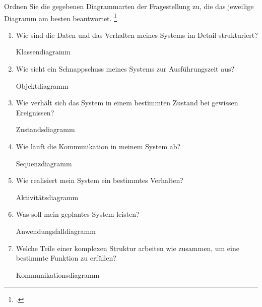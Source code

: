 \documentclass{bschlangaul-aufgabe}
\begin{document}

Ordnen Sie die gegebenen Diagrammarten der Fragestellung zu, die das
jeweilige Diagramm am besten beantwortet.
\footcite{sosy:e-klausur}

\begin{enumerate}

\item Wie sind die Daten und das Verhalten meines Systems im Detail
strukturiert?

\begin{bAntwort}
Klassendiagramm
\end{bAntwort}

\item Wie sieht ein Schnappschuss meines Systems zur Ausführungszeit
aus?

\begin{bAntwort}
Objektdiagramm
\end{bAntwort}

\item Wie verhält sich das System in einem bestimmten Zustand bei
gewissen Ereignissen?

\begin{bAntwort}
Zustandsdiagramm
\end{bAntwort}

\item Wie läuft die Kommunikation in meinem System ab?

\begin{bAntwort}
Sequenzdiagramm
\end{bAntwort}

\item Wie realisiert mein System ein bestimmtes Verhalten?

\begin{bAntwort}
Aktivitätsdiagramm
\end{bAntwort}

\item Was soll mein geplantes System leisten?

\begin{bAntwort}
Anwendungsfalldiagramm
\end{bAntwort}

\item Welche Teile einer komplexen Struktur arbeiten wie zusammen, um
eine bestimmte Funktion zu erfüllen?

\begin{bAntwort}
Kommunikationsdiagramm
\end{bAntwort}
\end{enumerate}
\end{document}
